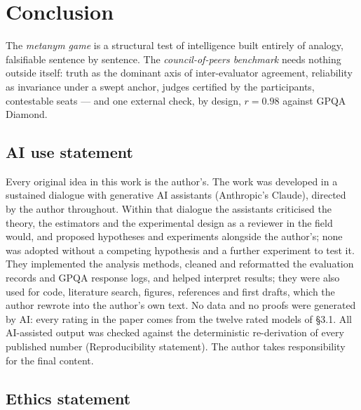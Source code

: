\documentclass{article}
\begin{document}
\section{Conclusion}\label{conclusion}

The \emph{metanym game} is a structural test of intelligence built entirely of analogy, falsifiable sentence by sentence. The \emph{council-of-peers benchmark} needs nothing outside itself: truth as the dominant axis of inter-evaluator agreement, reliability as invariance under a swept anchor, judges certified by the participants, contestable seats --- and one external check, by design, \(r = 0.98\) against GPQA Diamond.\label{endmain}

\subsection*{AI use statement}

Every original idea in this work is the author's. The work was developed in a sustained dialogue with generative AI assistants (Anthropic's Claude), directed by the author throughout. Within that dialogue the assistants criticised the theory, the estimators and the experimental design as a reviewer in the field would, and proposed hypotheses and experiments alongside the author's; none was adopted without a competing hypothesis and a further experiment to test it. They implemented the analysis methods, cleaned and reformatted the evaluation records and GPQA response logs, and helped interpret results; they were also used for code, literature search, figures, references and first drafts, which the author rewrote into the author's own text. No data and no proofs were generated by AI: every rating in the paper comes from the twelve rated models of \S{}3.1. All AI-assisted output was checked against the deterministic re-derivation of every published number (Reproducibility statement). The author takes responsibility for the final content.

\subsection*{Ethics statement}
\end{document}
